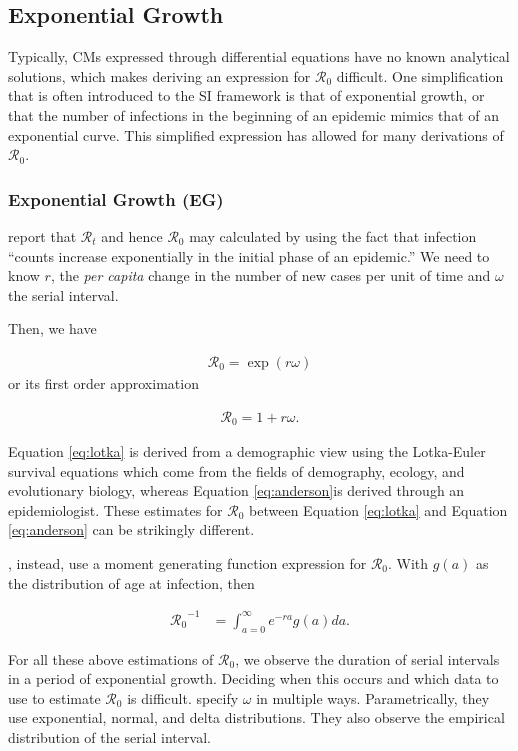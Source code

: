 \documentclass[12pt]{article}
\newcommand{\rr}{\ensuremath{\mathcal{R}_0}}
\begin{document}

\subsection{Exponential Growth}\label{sec:exp-growth}
Typically, CMs expressed through differential equations have no known analytical solutions, which makes deriving an expression for $\rr$ difficult.  One simplification that is often introduced to the SI framework is that of exponential growth, or that the number of infections in the beginning of an epidemic mimics that of an exponential curve.  This simplified expression has allowed for many derivations of $\rr$.


\subsubsection{Exponential Growth (EG)}
\label{sec:expgrowth}
\cite{wallinga2007generation} report that $\mathcal{R}_t$ and hence $\rr$ may calculated by using the fact that infection ``counts increase exponentially in the initial phase of an epidemic.''  We need to know $r$, the \textit{per capita} change in the number of new cases per unit of time and $\omega$ the serial interval.

Then, we have

\begin{align}\label{eq:lotka}
\rr = \exp{(r \omega)}
\end{align}
or its first order approximation

\begin{align}\label{eq:anderson}
\rr = 1 + r \omega.
\end{align}


Equation \eqref{eq:lotka} is derived from a demographic view using the Lotka-Euler survival equations which come from the fields of demography, ecology, and evolutionary biology, whereas Equation \eqref{eq:anderson}is derived through an epidemiologist.  These estimates for $\rr$ between Equation \eqref{eq:lotka} and Equation \eqref{eq:anderson} can be strikingly different.

\cite{wallinga2007generation}, instead, use a moment generating function expression for $\rr$.  With $g(a)$ as the distribution of age at infection, then

\begin{align*}
\rr^{-1} &= \int_{a=0}^\infty e^{-ra}g(a)da.
\end{align*}

For all these above estimations of $\rr$, we observe the duration of serial intervals in a period of exponential growth.  Deciding when this occurs and which data to use to estimate $\rr$ is difficult.  \citeauthor{wallinga2007generation} specify $\omega$ in multiple ways.  Parametrically, they use exponential, normal, and delta distributions.  They also observe the empirical distribution of the serial interval.
\end{document}
